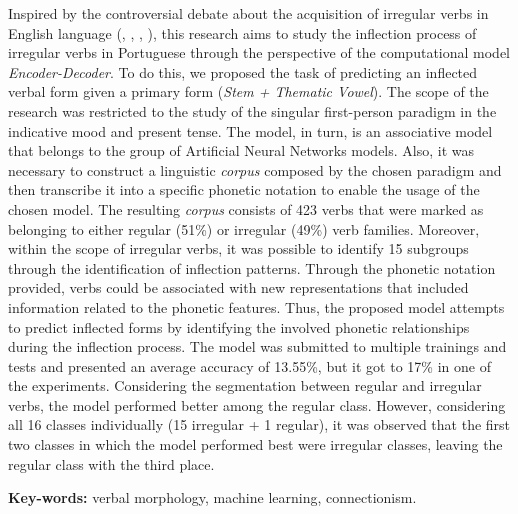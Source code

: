 \documentclass[12pt,twoside,a4paper]{book}
\begin{document}
Inspired by the controversial debate about the acquisition of irregular verbs in English language (\cite{chomsky:1968}, \cite{Pinker:1988},
\cite{Albright2003RulesVA}, \cite{kirov:2018}), this research aims to study the inflection process of irregular verbs in Portuguese through the perspective of the computational model \textit{Encoder-Decoder}. To do this, we proposed the task of predicting an inflected verbal form given a primary form (\textit{Stem + Thematic Vowel}). The scope of the research was restricted to the study of the singular first-person paradigm in the indicative mood and present tense. The model, in turn, is an associative model that belongs to the group of Artificial Neural Networks models. Also, it was necessary to construct a linguistic \textit{corpus} composed by the chosen paradigm and then transcribe it into a specific phonetic notation to enable the usage of the chosen model. The resulting \textit{corpus} consists of 423 verbs that were marked as belonging to either regular (51\%) or irregular (49\%) verb families. Moreover, within the scope of irregular verbs, it was possible to identify 15 subgroups through the identification of inflection patterns. Through the phonetic notation provided, verbs could be associated with new representations that included information related to the phonetic features. Thus, the proposed model attempts to predict inflected forms by identifying the involved phonetic relationships during the inflection process. The model was submitted to multiple trainings and tests and presented an average accuracy of 13.55\%, but it got to 17\% in one of the experiments. Considering the segmentation between regular and irregular verbs, the model performed better among the regular class. However, considering all 16 classes individually (15 irregular + 1 regular), it was observed that the first two classes in which the model performed best were irregular classes, leaving the regular class with the third place.

\textbf{Key-words:}
verbal morphology, machine learning, connectionism.

\pagestyle{fancy}
\onehalfspacing            %
\mainmatter
{}

\fancyhead[RE,LO]{\thesection}


% 
% 
% 
% 
 \singlespacing   %
\clearpage
\end{document}
